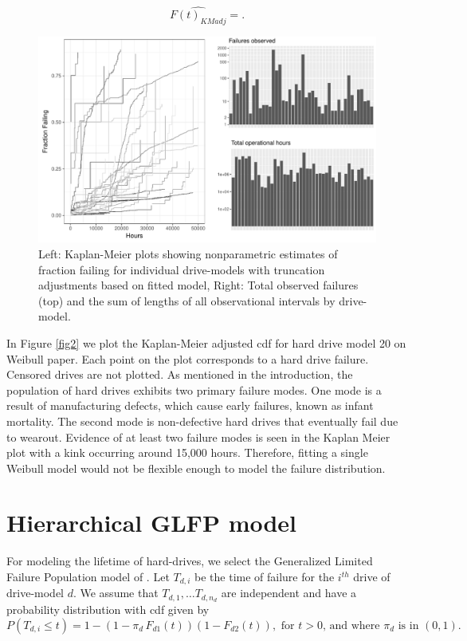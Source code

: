\documentclass[12pt]{article}
\begin{document}
$$\widehat{F(t)_{KMadj}} = .$$

\begin{figure}
\includegraphics[width=.8\textwidth]{fig/data_overview}
\caption{Left: Kaplan-Meier plots showing nonparametric estimates of fraction failing for individual drive-models with truncation adjustments based on fitted model, Right: Total observed failures (top) and the sum of lengths of all observational intervals by drive-model.}
\end{figure}

In Figure \ref{fig2} we plot the Kaplan-Meier adjusted cdf for hard drive model 20 on Weibull paper.  Each point on the plot corresponds to a hard drive failure.  Censored drives are not plotted.  As mentioned in the introduction, the population of hard drives exhibits two primary failure modes.  One mode is a result of manufacturing defects, which cause early failures, known as infant mortality.  The second mode is non-defective hard drives that eventually fail due to wearout.   Evidence of at least two failure modes is seen in the Kaplan Meier plot with a kink occurring around 15,000 hours.  Therefore, fitting a single Weibull model would not be flexible enough to model the failure distribution.


\section{Hierarchical GLFP model}
For modeling the lifetime of hard-drives, we select the Generalized Limited Failure Population model of \citet{chan}.
Let $T_{d,i}$ be the time of failure for the $i^{th}$ drive of drive-model $d$.
We assume that $T_{d,1},\ldots T_{d,n_d}$ are independent and have a probability distribution with cdf given by
$$P(T_{d,i}\le t) = 1 - (1-\pi_d\, F_{d1}(t))(1 - F_{d2}(t)), \mbox{ for }t>0 \mbox{, and where } \pi_d \mbox{ is in }(0,1).$$
\end{document}
